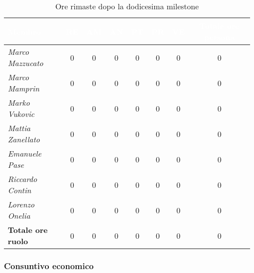 \begin{table}[H]
    \renewcommand\arraystretch{1.5}
    \centering
    \begin{tabular}{|l|c|c|c|c|c|c|c|}
    \hline
    \rowcolor[HTML]{036400}
    \textcolor{white}{\textbf{Membro}} & \multicolumn{1}{c|}{\textcolor{white}{\textbf{RE}}} & \multicolumn{1}{c|}{\textcolor{white}{\textbf{AM}}} & \multicolumn{1}{c|}{\textcolor{white}{\textbf{AN}}} & \multicolumn{1}{c|}{\textcolor{white}{\textbf{PT}}} & \multicolumn{1}{c|}{\textcolor{white}{\textbf{PR}}} & \multicolumn{1}{c|}{\textcolor{white}{\textbf{VE}}} & \multicolumn{1}{c|}{\textcolor{white}{\textbf{Totale ore persona}}} \\ \hline
    \rowcolor[HTML]{EFEFEF}\textit{Marco Mazzucato}  & 0    & 0    & 0     & 0     & 0     & 0      & 0   \\ \hline
    \rowcolor[HTML]{C0C0C0}\textit{Marco Mamprin}    & 0    & 0    & 0     & 0     & 0     & 0      & 0   \\ \hline
    \rowcolor[HTML]{EFEFEF}\textit{Marko Vukovic}    & 0    & 0    & 0     & 0     & 0     & 0      & 0    \\ \hline
    \rowcolor[HTML]{C0C0C0}\textit{Mattia Zanellato} & 0    & 0    & 0     & 0     & 0     & 0      & 0   \\ \hline
    \rowcolor[HTML]{EFEFEF}\textit{Emanuele Pase}    & 0    & 0    & 0     & 0     & 0     & 0      & 0 \\ \hline
    \rowcolor[HTML]{C0C0C0}\textit{Riccardo Contin}  & 0    & 0    & 0     & 0     & 0     & 0      & 0   \\ \hline
    \rowcolor[HTML]{EFEFEF}\textit{Lorenzo Onelia}   & 0    & 0    & 0     & 0     & 0     & 0      & 0 \\ \hline
    \rowcolor[HTML]{C0C0C0}\textbf{Totale ore ruolo} & 0    & 0    & 0     & 0     & 0     & 0      & 0   \\ \hline
    \end{tabular}
    \caption{Ore rimaste dopo la dodicesima milestone}
\end{table}

\subsubsection{Consuntivo economico}

